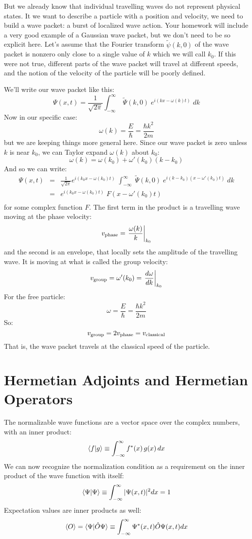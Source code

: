 \documentclass[12pt]{book}
\begin{document}
But we already know that individual travelling waves do not represent
physical states.  It we want to describe a particle with a position
and velocity, we need to build a wave packet: a burst of localized
wave action.  Your homework will include a very good example of a
Gaussian wave packet, but we don't need to be so explicit here.  Let's
assume that the Fourier transform $\widetilde{\psi}(k,0)$ of the wave
packet is nonzero only close to a single value of $k$ which we will
call $k_0$.  If this were not true, different parts of the wave packet
will travel at different speeds, and the notion of the velocity of the
particle will be poorly defined.

We'll write our wave packet like this:
$$ \Psi(x,t) = \frac{1}{\sqrt{2\pi}} \int_{-\infty}^{\infty} \; \widetilde{\Psi}(k,0) \;  
e^{\displaystyle i(kx - \omega(k)t)}\; dk $$
Now in our specific case:
$$\omega(k) = \frac{E}{\hbar} = \frac{\hbar k^2}{2m}$$
but we are keeping things more general here.  Since our wave packet is
zero unless $k$ is near $k_0$, we can Taylor expand $\omega(k)$ about
$k_0$:
$$\omega(k) = \omega(k_0) + \omega'(k_0) (k - k_0) $$
And so we can write:
\begin{eqnarray*}
\Psi(x,t) &=& \frac{1}{\sqrt{2\pi}} 
e^{\displaystyle i(k_0x - \omega(k_0)t)}\;
\int_{-\infty}^{\infty} \; \widetilde{\Psi}(k,0) \;  
e^{\displaystyle i(k-k_0)(x - \omega'(k_0)t)}\; dk\\ 
&=& e^{\displaystyle i(k_0x - \omega(k_0)t)}\; F(x - \omega'(k_0)t)\\
\end{eqnarray*}
for some complex function $F$.  The first term in the product is a travelling wave moving at the phase velocity:
$$v_{\rm phase} = \left. \frac{\omega(k)}{k} \right\rvert_{k_0}$$
and the second is an envelope, that locally sets the amplitude of the travelling wave.  It is moving at what is called the group velocity:
$$ v_{\rm group} = \omega'(k_0) = \left. \frac{d\omega}{dk} \right\rvert_{k_0}$$
For the free particle:
$$\omega = \frac{E}{\hbar} = \frac{\hbar k^2}{2m}$$
So:
$$v_{\rm group} = 2 v_{\rm phase} = v_{\rm classical}$$
That is, the wave packet travels at the classical speed of the particle.

\section{Hermetian Adjoints and Hermetian Operators}
The normalizable wave functions are a vector space over the complex numbers, with an inner product:
\begin{equation}
\braket{f|g} \equiv \int_{-\infty}^{\infty} f^*(x) \, g(x) \, dx
\end{equation}
We can now recognize the normalization condition as a requirement on the inner product of the wave function with itself:
\begin{equation}
\braket{\Psi|\Psi} \equiv \int_{-\infty}^{\infty} |\Psi(x,t)|^2 dx = 1
\end{equation}
Expectation values are inner products as well:
\begin{equation}
\braket{O} = \braket{\Psi|\hat{O}\Psi} \equiv \int_{-\infty}^{\infty} \Psi^*(x,t)\hat{O}\Psi(x,t) dx
\end{equation}
\end{document}
